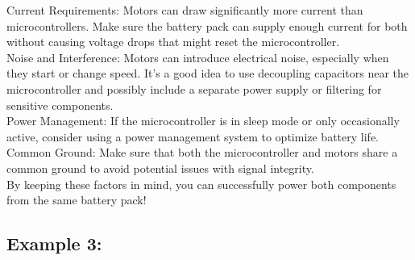 \noindent Current Requirements: Motors can draw significantly more current than microcontrollers. Make sure the battery pack can supply enough current for both without causing voltage drops that might reset the microcontroller.\\

\noindent Noise and Interference: Motors can introduce electrical noise, especially when they start or change speed. It’s a good idea to use decoupling capacitors near the microcontroller and possibly include a separate power supply or filtering for sensitive components.\\

\noindent Power Management: If the microcontroller is in sleep mode or only occasionally active, consider using a power management system to optimize battery life.\\

\noindent Common Ground: Make sure that both the microcontroller and motors share a common ground to avoid potential issues with signal integrity.\\

\noindent By keeping these factors in mind, you can successfully power both components from the same battery pack!
\subsection{Example 3: }